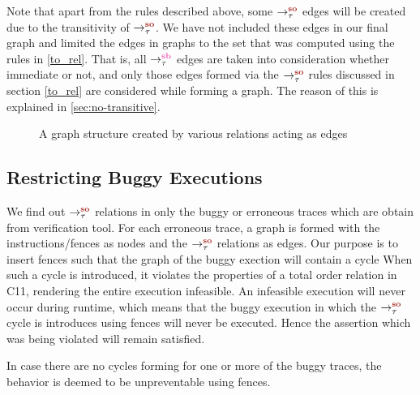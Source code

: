 Note that apart from the rules described above, some $\setSO$ edges 
will be created due to the transitivity of $\setSO$.
We have not included these edges in our final graph and limited 
the edges in graphs to the set that was computed using the rules 
in \textsection\ref{to_rel}. That is, all $\setSB$ edges are taken into 
consideration whether immediate 
or not, and only those edges formed via the $\setSO$ rules discussed in 
section \textsection\ref{to_rel} are considered while forming a graph. 
The reason of this is explained in \textsection\ref{sec:no-transitive}.


\begin{figure}
\begin{center}
	
	\caption{A graph structure created by various relations acting as edges}
	\label{fig:cycles}
\end{center}
\end{figure}

\subsection{Restricting Buggy Executions}
\par
We find out $\setSO$ relations in only the buggy or erroneous traces which 
are obtain from verification tool. For each erroneous trace, a graph is 
formed with the instructions/fences as nodes and the $\setSO$ relations as 
edges. 
Our purpose is to insert fences such that the graph of the buggy exection 
will contain a cycle 
When such a cycle is introduced, it violates the properties of a total 
order relation in C11, rendering the entire execution infeasible. 
An infeasible execution will never occur during runtime, which means 
that the buggy execution in which the $\setSO$ cycle is introduces using 
fences will never be executed. 
Hence the assertion which was being violated will remain satisfied. 

In case there are no cycles forming for one or more of the buggy traces, 
the behavior is deemed to be unpreventable using \mosc fences. 

